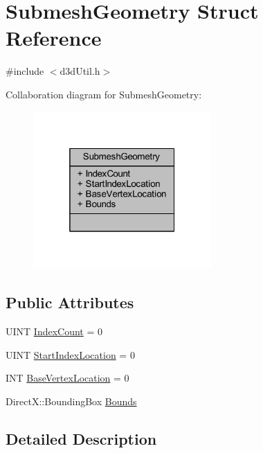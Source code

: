 \hypertarget{struct_submesh_geometry}{}\section{Submesh\+Geometry Struct Reference}
\label{struct_submesh_geometry}


{\ttfamily \#include $<$d3d\+Util.\+h$>$}



Collaboration diagram for Submesh\+Geometry\+:\nopagebreak
\begin{figure}[H]
\begin{center}
\leavevmode
\includegraphics[width=193pt]{struct_submesh_geometry__coll__graph}
\end{center}
\end{figure}
\subsection*{Public Attributes}
\begin{DoxyCompactItemize}
\item 
U\+I\+NT \hyperlink{struct_submesh_geometry_ab28b180ab73cabb07553c76f3f32c180_ab28b180ab73cabb07553c76f3f32c180}{Index\+Count} = 0
\item 
U\+I\+NT \hyperlink{struct_submesh_geometry_a56f8aee51b11ee61a229679000a1aeb6_a56f8aee51b11ee61a229679000a1aeb6}{Start\+Index\+Location} = 0
\item 
I\+NT \hyperlink{struct_submesh_geometry_a95e805e2c8022aea5826d7343ee7dc20_a95e805e2c8022aea5826d7343ee7dc20}{Base\+Vertex\+Location} = 0
\item 
Direct\+X\+::\+Bounding\+Box \hyperlink{struct_submesh_geometry_ac79bad539c71ede2aa15b2527cacaa97_ac79bad539c71ede2aa15b2527cacaa97}{Bounds}
\end{DoxyCompactItemize}


\subsection{Detailed Description}


